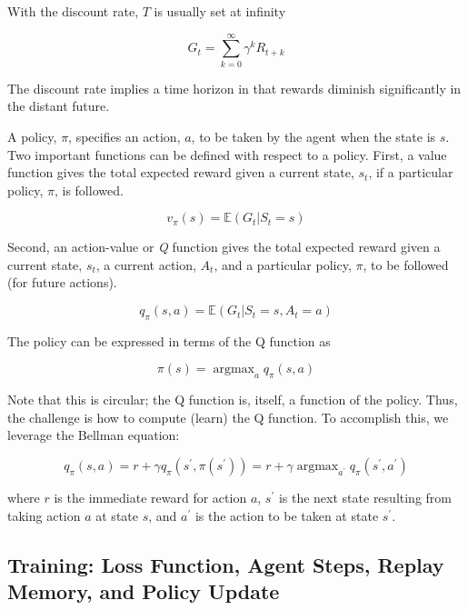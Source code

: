 \documentclass[acmlarge,screen]{acmart}
\DeclareMathOperator*{\argmax}{argmax}
\begin{document}
With the discount rate, $T$ is usually set at infinity

\begin{equation}
  G_t = \sum_{k=0}^\infty \gamma^k R_{t+k} 
\end{equation}

The discount rate implies a time horizon in that rewards diminish significantly in the distant future.

A policy, $\pi$, specifies an action, $a$, to be taken by the agent when the state is $s$.  
Two important functions can be defined with respect to a policy.
First, a value function gives the total expected reward given a current state, $s_t$, 
if a particular policy, $\pi$, is followed.

\begin{equation}
  v_\pi (s) = \mathbb{E} \left( G_t \vert S_t = s \right)
\end{equation}

Second, an action-value or \textit{Q} function gives the total expected reward given a current state, $s_t$, 
a current action, $A_t$,
and a particular policy, $\pi$, to be followed (for future actions).

\begin{equation}
  q_\pi (s,a) = \mathbb{E} \left( G_t \vert S_t = s, A_t = a \right)
\end{equation}

The policy can be expressed in terms of the Q function as

\begin{equation}
  \pi(s) = \argmax_a q_\pi (s,a)
\end{equation}

Note that this is circular;  the Q function is, itself, a function of the policy.  
Thus, the challenge is how to compute (learn) the Q function.
To accomplish this, we leverage the Bellman equation:

\begin{equation} \label{eq:tempdiff1}
  q_\pi (s,a) = r + \gamma q_\pi (s^\prime, \pi(s^\prime)) = r + \gamma \argmax_{a^\prime} q_\pi (s^\prime, a^\prime)
\end{equation}

\noindent where $r$ is the immediate reward for action $a$, $s^\prime$ is the next state resulting from taking
action $a$ at state $s$, and $a^\prime$ is the action to be taken at state $s^\prime$.



\subsection{Training: Loss Function, Agent Steps, Replay Memory, and Policy Update}
\end{document}
